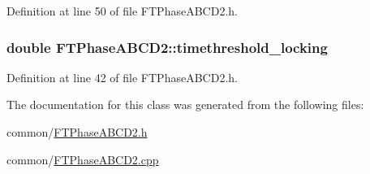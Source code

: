 Definition at line 50 of file FTPhaseABCD2.h.

\hypertarget{classFTPhaseABCD2_a9d54cd7a78d5372bf59e8a4aef3b200a}{
\subsubsection[{timethreshold\_\-locking}]{\setlength{\rightskip}{0pt plus 5cm}double {\bf FTPhaseABCD2::timethreshold\_\-locking}}}
\label{classFTPhaseABCD2_a9d54cd7a78d5372bf59e8a4aef3b200a}


Definition at line 42 of file FTPhaseABCD2.h.



The documentation for this class was generated from the following files:\begin{DoxyCompactItemize}
\item 
common/\hyperlink{FTPhaseABCD2_8h}{FTPhaseABCD2.h}\item 
common/\hyperlink{FTPhaseABCD2_8cpp}{FTPhaseABCD2.cpp}\end{DoxyCompactItemize}
